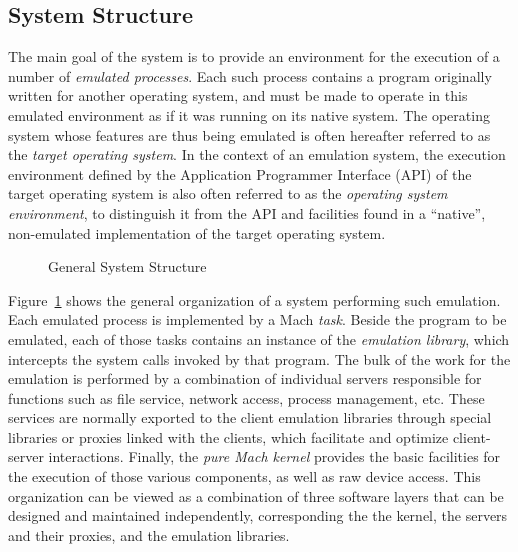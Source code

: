 \subsection{System Structure}

The main goal of the system is to provide an environment for the
execution of a number of {\em emulated processes}.  Each such process
contains a program originally written for another operating system,
and must be made to operate in this emulated environment as if it was
running on its native system. The operating system whose features are
thus being emulated is often hereafter referred to as the {\em target
operating system}. In the context of an emulation system, the
execution environment defined by the Application Programmer Interface
(API) of the target operating system is also often referred to as the
{\em operating system environment}, to distinguish it from the API and
facilities found in a ``native'', non-emulated implementation of the
target operating system.

\begin{figure}
\vspace{8cm}
\caption{General System Structure}\label{fig:layers}
\end{figure}

Figure~\ref{fig:layers} shows the general organization of a system
performing such emulation. Each emulated process is implemented by a
Mach {\em task}. Beside the program to be emulated, each of those
tasks contains an instance of the {\em emulation library}, which
intercepts the system calls invoked by that program. The bulk of the
work for the emulation is performed by a combination of individual
servers responsible for functions such as file service, network
access, process management, etc. These services are normally exported
to the client emulation libraries through special libraries or proxies
linked with the clients, which facilitate and optimize client-server
interactions. Finally, the {\em pure Mach kernel} provides the basic
facilities for the execution of those various components, as well as
raw device access. This organization can be viewed as a combination of
three software layers that can be designed and maintained
independently, corresponding the the kernel, the servers and their
proxies, and the emulation libraries.



